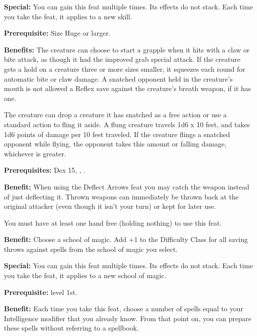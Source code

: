 \textbf{Special:} You can gain this feat multiple times. Its effects do not stack. Each time you take the feat, it applies to a new skill.


\textbf{Prerequisite:} Size Huge or larger.

\textbf{Benefits:} The creature can choose to start a grapple when it hits with a claw or bite attack, as though it had the improved grab special attack. If the creature gets a hold on a creature three or more sizes smaller, it squeezes each round for automatic bite or claw damage. A snatched opponent held in the creature's mouth is not allowed a Reflex save against the creature's breath weapon, if it has one.

The creature can drop a creature it has snatched as a free action or use a standard action to fling it aside. A flung creature travels 1d6 x 10 feet, and takes 1d6 points of damage per 10 feet traveled. If the creature flings a snatched opponent while flying, the opponent takes this amount or falling damage, whichever is greater.


\textbf{Prerequisites:} Dex 15, , .

\textbf{Benefit:} When using the Deflect Arrows feat you may catch the weapon instead of just deflecting it. Thrown weapons can immediately be thrown back at the original attacker (even though it isn't your turn) or kept for later use.

You must have at least one hand free (holding nothing) to use this feat.


\textbf{Benefit:} Choose a school of magic. Add +1 to the Difficulty Class for all saving throws against spells from the school of magic you select.

\textbf{Special:} You can gain this feat multiple times. Its effects do not stack. Each time you take the feat, it applies to a new school of magic.


\textbf{Prerequisite:}  level 1st.

\textbf{Benefit:} Each time you take this feat, choose a number of spells equal to your Intelligence modifier that you already know. From that point on, you can prepare these spells without referring to a spellbook.

